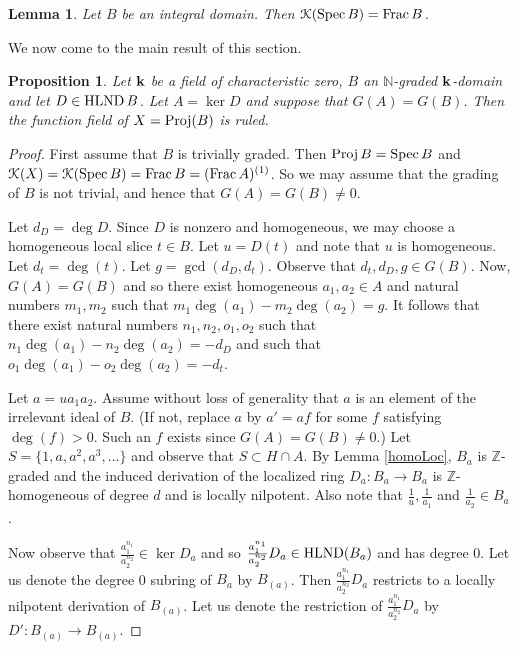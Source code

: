 \documentclass[12pt]{amsart}
\theoremstyle{plain}
\newtheorem{proposition}[subsection]{Proposition}
\newtheorem{lemma}[subsection]{Lemma}
\theoremstyle{definition}
\newcommand{\Spec}{		\operatorname{{\rm Spec}}}
\newcommand{\Proj}{		\operatorname{{\rm Proj}}}
\newcommand{\Frac}{		\operatorname{{\rm Frac}}}
\newcommand{\Integ}{\ensuremath{\mathbb{Z}}}
\newcommand{\Nat}{\ensuremath{\mathbb{N}}}
\newcommand{\bk}{{\ensuremath{\rm \bf k}}}
\newcommand{\Keul}{\EuScript{K}}
\newcommand{\hlnd}{\operatorname{{\rm HLND}}}
\begin{document}
\begin{lemma}\label{functionFraction} Let $B$ be an integral domain. Then $\Keul(\Spec B) = \Frac B$. 
\end{lemma}

We now come to the main result of this section. 

\begin{proposition} \label{mainResult} Let $\bk$ be a field of characteristic zero, $B$ an $\Nat$-graded $\bk$-domain and let $D \in \hlnd B$. Let $A = \ker D$ and suppose that $G(A) = G(B)$. Then the function field of $X = \Proj(B)$ is ruled.
\end{proposition}

\begin{proof}
	First assume that $B$ is trivially graded. Then $\Proj B = \Spec B$ and $\Keul(X) = \Keul(\Spec B) = \Frac B = (\Frac A)^{(1)}$. So we may assume that the grading of $B$ is not trivial, and hence that $G(A) = G(B) \neq 0$.  
	
	Let $d_D = \deg D$. Since $D$ is nonzero and homogeneous, we may choose a homogeneous local slice $t \in B$. Let $u = D(t)$ and note that $u$ is homogeneous. Let $d_t = \deg(t)$. Let $g = \gcd(d_D,d_t)$. Observe that $d_t,d_D,g \in G(B)$. Now, $G(A) = G(B)$ and so there exist homogeneous $a_1,a_2 \in A$ and natural numbers $m_1,m_2$ such that $m_1\deg(a_1) - m_2\deg(a_2) = g$. It follows that there exist natural numbers $n_1,n_2,o_1,o_2$ such that $n_1\deg(a_1) - n_2 \deg(a_2) = -d_D$ and such that $o_1\deg(a_1) - o_2 \deg(a_2) = -d_t$. 
	
	Let $a = ua_1a_2$. Assume without loss of generality that $a$ is an element of the irrelevant ideal of $B$. (If not, replace $a$ by $a' = af$ for some $f$ satisfying $\deg(f) > 0$. Such an $f$ exists since $G(A) = G(B) \neq 0$.) Let $S = \{1, a, a^2, a^3, ... \}$ and observe that $S \subset H \cap A$. By Lemma \ref{homoLoc}, $B_a$ is $\Integ$-graded and the induced derivation of the localized ring $D_a: B_a \to B_a$ is $\Integ$-homogeneous of degree $d$ and is locally nilpotent. Also note that $\frac{1}{u},\frac{1}{a_1}$ and $\frac{1}{a_2} \in B_a$.  
	
	Now observe that $\frac{a_1^{n_1}}{a_2^{n_2}} \in \ker D_a$ and so $\frac{a_1^{n_1}}{a_2^{n_2}} D_a \in \hlnd(B_a)$ and has degree 0. Let us denote the degree 0 subring of $B_a$ by $B_{(a)}$. Then $\frac{a_1^{n_1}}{a_2^{n_2}} D_a$ restricts to a locally nilpotent derivation of $B_{(a)}$. Let us denote the restriction of $\frac{a_1^{n_1}}{a_2^{n_2}} D_a$ by $D' : B_{(a)} \to  B_{(a)}$.  
	

\end{proof}
\end{document}
